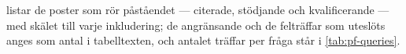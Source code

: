  listar de poster som rör påståendet --- citerade,
stödjande och kvalificerande --- med skälet till varje inkludering; de
angränsande och de felträffar som uteslöts anges som antal i tabelltexten,
och antalet träffar per fråga står i \cref{tab:pf-queries}.
